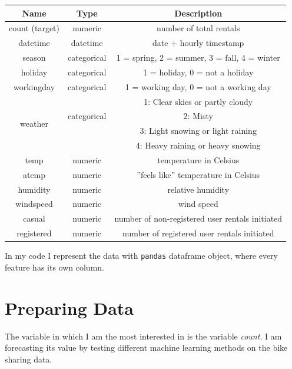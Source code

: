 \documentclass[12pt]{article}
\begin{document}
	\begin{center}
		\begin{tabular}{ |c|c|c| } 
			\hline
			\textbf{Name} & \textbf{Type} & \textbf{Description} \\ 
			\hline
			\hline
			count (target) & numeric & number of total rentals \\ 
			\hline
			datetime & datetime & date + hourly timestamp \\
			\hline
			season & categorical & 1 = spring, 2 = summer, 3 = fall, 4 = winter  \\ 
			\hline
			holiday & categorical & 1 = holiday, 0 = not a holiday \\ 
			\hline
			workingday & categorical & 1 = working day, 0 = not a working day \\ 
			\hline
			\multirow{4}{4em}{weather} &  & 1: Clear skies or partly cloudy \\ 
			& categorical & 2: Misty \\ 
			&  & 3: Light snowing or light raining \\ 
			&  & 4: Heavy raining or heavy snowing  \\ 
			\hline
			temp & numeric & temperature in Celsius \\ 
			\hline
			atemp & numeric & ''feels like'' temperature in Celsius \\ 
			\hline
			humidity & numeric &  relative humidity \\ 
			\hline
			windspeed & numeric &  wind speed \\  
			\hline
			casual & numeric & number of non-registered user rentals initiated \\ 
			\hline
			registered & numeric &  number of registered user rentals initiated \\ 
			\hline
			
		\end{tabular}
	\end{center}

	In my code I represent the data with \texttt{pandas} dataframe object, where every feature has its own column.
	
	\section{Preparing Data}
	The variable in which I am the most interested in is the variable \textit{count}. I am forecasting its value by testing different machine learning methods on the bike sharing data.
	
\end{document}
